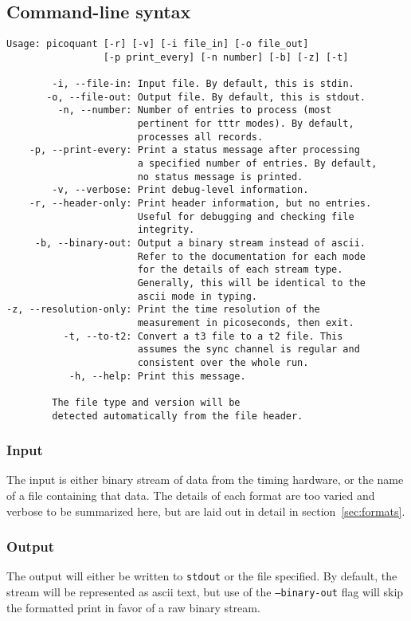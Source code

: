 \documentclass{article}
\newcommand{\stdout}{\texttt{stdout}}
\begin{document}
\subsection{Command-line syntax}

\begin{verbatim}
Usage: picoquant [-r] [-v] [-i file_in] [-o file_out]
                 [-p print_every] [-n number] [-b] [-z] [-t]

        -i, --file-in: Input file. By default, this is stdin.
       -o, --file-out: Output file. By default, this is stdout.
         -n, --number: Number of entries to process (most 
                       pertinent for tttr modes). By default, 
                       processes all records.
    -p, --print-every: Print a status message after processing 
                       a specified number of entries. By default,
                       no status message is printed.
        -v, --verbose: Print debug-level information.
    -r, --header-only: Print header information, but no entries. 
                       Useful for debugging and checking file 
                       integrity.
     -b, --binary-out: Output a binary stream instead of ascii. 
                       Refer to the documentation for each mode 
                       for the details of each stream type. 
                       Generally, this will be identical to the
                       ascii mode in typing.
-z, --resolution-only: Print the time resolution of the 
                       measurement in picoseconds, then exit.
          -t, --to-t2: Convert a t3 file to a t2 file. This
                       assumes the sync channel is regular and
                       consistent over the whole run.
           -h, --help: Print this message.

        The file type and version will be 
        detected automatically from the file header.
\end{verbatim}

\subsubsection{Input}
The input is either binary stream of data from the timing hardware, or the name of a file containing that data. The details of each format are too varied and verbose to be summarized here, but are laid out in detail in section~\ref{sec:formats}.

\subsubsection{Output}
\label{sec:picoquant_output}
The output will either be written to \stdout{} or the file specified. By default, the stream will be represented as ascii text, but use of the \texttt{--binary-out} flag will skip the formatted print in favor of a raw binary stream. 
\end{document}
